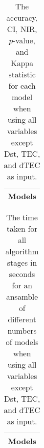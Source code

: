 \begin{table}[!ht]
	\centering
	\begin{tabular}{|c|}
		\hline
		Models \\ \hline
	\end{tabular}
	\caption{The accuracy, CI, NIR, $p$-value, and Kappa statistic for each model when using all variables except Dst, TEC, and dTEC as input.}
	\label{tab:time:ansamble:noTEC}
\end{table}

\begin{table}[!ht]
	\centering
	\begin{tabular}{|c|}
		\hline
		Models \\ \hline
	\end{tabular}
	\caption{The time taken for all algorithm stages in seconds for an ansamble of different numbers of models when using all variables except Dst, TEC, and dTEC as input.}
	\label{tab:time:ansamble:reverse:noTEC}
\end{table}

